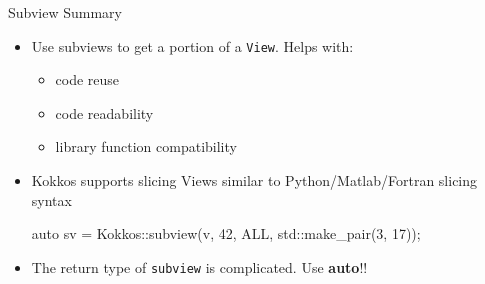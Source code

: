
\begin{frame}[fragile]{Subview Summary}

  \begin{itemize}
    \item Use subviews to get a portion of a \texttt{View}. Helps with:
	    \begin{itemize}
           \item code reuse
	   \item code readability
	   \item library function compatibility
	    \end{itemize}
    \pause
    \item Kokkos supports slicing Views similar to Python/Matlab/Fortran slicing syntax 
	\begin{code}[]
auto sv = Kokkos::subview(v, 42, ALL, std::make_pair(3, 17));
	\end{code}
    \pause
    \item The return type of \texttt{subview} is complicated. Use \textbf{auto}!!
  \end{itemize}

\end{frame}
